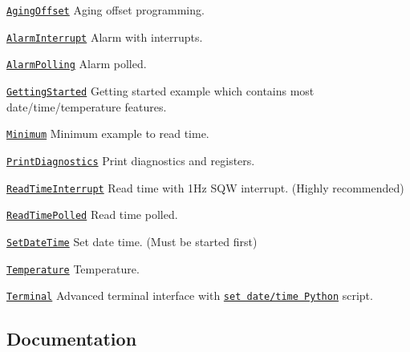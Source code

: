 \begin{DoxyItemize}
\item \href{https://github.com/Erriez/ErriezDS3231/blob/master/examples/AgingOffset/AgingOffset.ino}{\tt Aging\+Offset} Aging offset programming.
\item \href{https://github.com/Erriez/ErriezDS3231/blob/master/examples/AlarmInterrupt/AlarmInterrupt.ino}{\tt Alarm\+Interrupt} Alarm with interrupts.
\item \href{https://github.com/Erriez/ErriezDS3231/blob/master/examples/AlarmPolling/AlarmPolling.ino}{\tt Alarm\+Polling} Alarm polled.
\item \href{https://github.com/Erriez/ErriezDS3231/blob/master/examples/GettingStarted/GettingStarted.ino}{\tt Getting\+Started} Getting started example which contains most date/time/temperature features.
\item \href{https://github.com/Erriez/ErriezDS3231/blob/master/examples/Minimum/Minimum.ino}{\tt Minimum} Minimum example to read time.
\item \href{https://github.com/Erriez/ErriezDS3231/blob/master/examples/PrintDiagnostics/PrintDiagnostics.ino}{\tt Print\+Diagnostics} Print diagnostics and registers.
\item \href{https://github.com/Erriez/ErriezDS3231/blob/master/examples/ReadTimeInterrupt/ReadTimeInterrupt.ino}{\tt Read\+Time\+Interrupt} Read time with 1\+Hz S\+QW interrupt. (Highly recommended)
\item \href{https://github.com/Erriez/ErriezDS3231/blob/master/examples/ReadTimePolled/ReadTimePolled.ino}{\tt Read\+Time\+Polled} Read time polled.
\item \href{https://github.com/Erriez/ErriezDS3231/blob/master/examples/SetDateTime/SetDateTime.ino}{\tt Set\+Date\+Time} Set date time. (Must be started first)
\item \href{https://github.com/Erriez/ErriezDS3231/blob/master/examples/Temperature/Temperature.ino}{\tt Temperature} Temperature.
\item \href{https://github.com/Erriez/ErriezDS3231/blob/master/examples/Terminal/Terminal.ino}{\tt Terminal} Advanced terminal interface with \href{https://github.com/Erriez/ErriezDS3231/blob/master/examples/Terminal/Terminal.py}{\tt set date/time Python} script.
\end{DoxyItemize}

\subsection*{Documentation}


